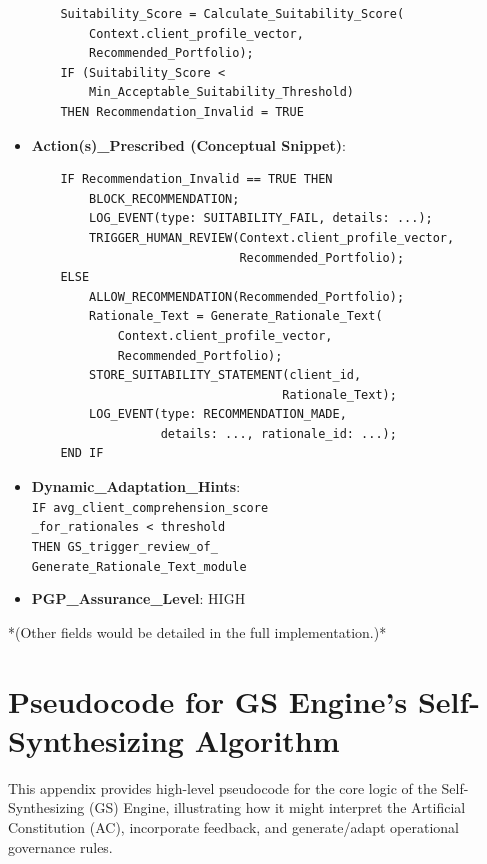 \documentclass[sigconf,review,anonymous=false]{acmart} %
\begin{document}
\begin{itemize}
{\begin{verbatim}
    Suitability_Score = Calculate_Suitability_Score(
        Context.client_profile_vector,
        Recommended_Portfolio);
    IF (Suitability_Score <
        Min_Acceptable_Suitability_Threshold)
    THEN Recommendation_Invalid = TRUE
    \end{verbatim}
    }
    \item \textbf{Action(s)\_Prescribed (Conceptual Snippet)}:
    {\tiny
    \begin{verbatim}
    IF Recommendation_Invalid == TRUE THEN
        BLOCK_RECOMMENDATION;
        LOG_EVENT(type: SUITABILITY_FAIL, details: ...);
        TRIGGER_HUMAN_REVIEW(Context.client_profile_vector,
                             Recommended_Portfolio);
    ELSE
        ALLOW_RECOMMENDATION(Recommended_Portfolio);
        Rationale_Text = Generate_Rationale_Text(
            Context.client_profile_vector,
            Recommended_Portfolio);
        STORE_SUITABILITY_STATEMENT(client_id,
                                   Rationale_Text);
        LOG_EVENT(type: RECOMMENDATION_MADE,
                  details: ..., rationale_id: ...);
    END IF
    \end{verbatim}
    }
    \item \textbf{Dynamic\_Adaptation\_Hints}: \\
    \texttt{IF avg\_client\_comprehension\_score} \\
    \texttt{\_for\_rationales < threshold} \\
    \texttt{THEN GS\_trigger\_review\_of\_} \\
    \texttt{Generate\_Rationale\_Text\_module}
    \item \textbf{PGP\_Assurance\_Level}: HIGH
\end{itemize}
*(Other fields would be detailed in the full implementation.)*

\section{Pseudocode for GS Engine's Self-Synthesizing Algorithm}
\label{app:gs_pseudocode}
This appendix provides high-level pseudocode for the core logic of the Self-Synthesizing (GS) Engine, illustrating how it might interpret the Artificial Constitution (AC), incorporate feedback, and generate/adapt operational governance rules.
\end{document}
